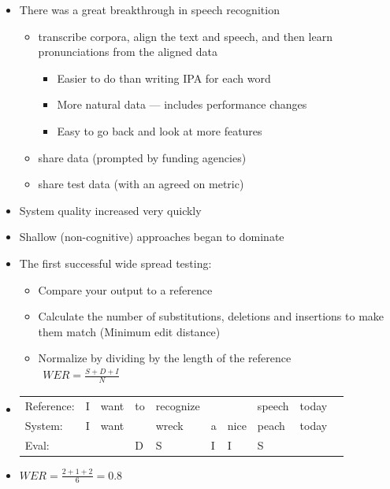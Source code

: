 \documentclass[a4paper,landscape,headrule,footrule,dvips]{foils}
\begin{document}
\begin{CJK}{UTF8}{min}

\begin{itemize}
\item There was a great breakthrough in speech recognition
  \begin{itemize}
  \item transcribe corpora, align the text and speech,
    and then learn pronunciations from the aligned data
    \begin{itemize}
    \item Easier to do than writing IPA for each word
    \item More natural data --- includes performance changes
    \item Easy to go back and look at more features
    \end{itemize}
  \item share data (prompted by funding agencies)
  \item share test data (with an agreed on metric)
  \end{itemize}
\item System quality increased very quickly
\item Shallow (non-cognitive) approaches began to dominate
\end{itemize}



\begin{itemize}
\item The first successful wide spread testing:
  \begin{itemize}
  \item Compare your output to a reference
  \item Calculate the number of substitutions, deletions and insertions to make them match
(Minimum edit distance)
  \item Normalize by dividing by the length of the reference\\[2ex]
    {\Large
    $\begin{array}{lcr}
      WER = \frac{S+D+I}{N}
    \end{array}$
}
  \end{itemize}

\item 
  \begin{tabular}[t]{llllllllll}
    Reference: & I &want &to &recognize&  & &speech & today \\
    System:    & I &want &   &wreck    &a &nice &peach & today\\
    Eval:      &   &     & D   & S       & I & I & S \\
  \end{tabular}
\item $WER=\frac{2+1+2}{6}=0.8$


\end{itemize}
\end{CJK}
\end{document}
